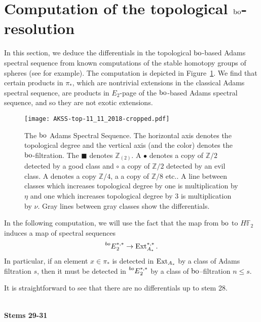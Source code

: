 
\section{Computation of the topological $\mathrm{bo}$-resolution}\label{sec:topcomp}


In this section, we deduce the differentials in the topological $\mathrm{bo}$-based Adams spectral sequence from known computations of the stable homotopy groups of spheres (see \cite{Isaksen} for example). The computation is depicted in Figure~\ref{fig:boASSchart}. We find that certain products in $\pi_\ast$, which are nontrivial extensions in the classical Adams spectral sequence, are products in $E_2$-page of the $\mathrm{bo}$-based Adams spectral sequence, and so they are not exotic extensions. 

\begin{figure}
\texttt{[image: AKSS-top-11\_11\_2018-cropped.pdf]}
\caption{The $\mathrm{bo}$ Adams Spectral Sequence. The horizontal axis denotes the topological degree and the vertical axis (and the color) denotes the $\mathrm{bo}$-filtration. 
The $\blacksquare$  denotes $\mathbb{Z}_{(2)}$.  A $\bullet$ denotes a copy of $\mathbb{Z}/2$ detected by a good class and $\circ$ a copy of $\mathbb{Z}/2$ detected by an evil class. 
A \circled{$\bullet$} denotes a copy $\mathbb{Z}/4$, a \circled{\circled{$\bullet$}} a copy of $\mathbb{Z}/8$ etc.. A line between classes which increases topological degree by one is multiplication by $\eta$ and one which increases topological degree by $3$ is multiplication by $\nu$. Gray lines between gray classes show the differentials.
}\label{fig:boASSchart}
\end{figure}


\begin{rem}\label{rem:filt}
In the following computation, we will use the fact that the map from $\mathrm{bo}$ to $H\mathbb{F}_2$ induces a map of spectral sequences
\[\prescript{bo}{}{E}^{*,*}_2 \to \operatorname{Ext}_{A_*}^{*,*}.\]
In particular, if an element $x \in \pi_*$ is detected in $\operatorname{Ext}_{A_*}$ by a class of Adams filtration $s$, then it must be detected in $\prescript{bo}{}{E}^{*,*}_2 $ by a class of $\mathrm{bo}$--filtration $n \leq s$. 
\end{rem}

It is straightforward to see that there are no differentials up to stem 28.

\ \\
\noindent
{\bf Stems 29-31}


